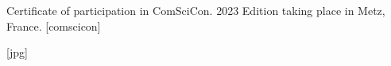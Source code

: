 
\begin{myFigEnv}[H][width=0.6\linewidth]
    {Certificate of participation in ComSciCon.}%
    {2023 Edition taking place in Metz, France.}%
    [comscicon]

    [jpg]

\end{myFigEnv}
